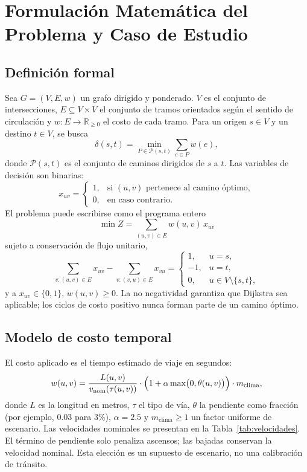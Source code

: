 \section{Formulación Matemática del Problema y Caso de Estudio}
\label{sec:formulacion}

\subsection{Definición formal}
Sea $G=(V,E,w)$ un grafo dirigido y ponderado. $V$ es el conjunto de intersecciones, $E\subseteq V\times V$ el conjunto de tramos orientados según el sentido de circulación y $w:E\to\mathbb{R}_{\ge 0}$ el costo de cada tramo. Para un origen $s\in V$ y un destino $t\in V$, se busca
\begin{equation}
    \delta(s,t)=\min_{P\in\mathcal{P}(s,t)}\sum_{e\in P}w(e),
    \label{eq:objetivo}
\end{equation}
donde $\mathcal{P}(s,t)$ es el conjunto de caminos dirigidos de $s$ a $t$. Las variables de decisión son binarias:
\begin{equation}
    x_{uv}=\begin{cases}1, & \text{si }(u,v)\text{ pertenece al camino óptimo},\\ 0, & \text{en caso contrario.}\end{cases}
    \label{eq:variables}
\end{equation}
El problema puede escribirse como el programa entero
\begin{equation}
    \min Z=\sum_{(u,v)\in E}w(u,v)\,x_{uv}
    \label{eq:z}
\end{equation}
sujeto a conservación de flujo unitario,
\begin{equation}
    \sum_{v:(u,v)\in E}x_{uv}-\sum_{v:(v,u)\in E}x_{vu}=
    \begin{cases}
        1, & u=s,\\
        -1, & u=t,\\
        0, & u\in V\setminus\{s,t\},
    \end{cases}
    \label{eq:flujo}
\end{equation}
y a $x_{uv}\in\{0,1\}$, $w(u,v)\ge 0$. La no negatividad garantiza que Dijkstra sea aplicable; los ciclos de costo positivo nunca forman parte de un camino óptimo.

\subsection{Modelo de costo temporal}
El costo aplicado es el tiempo estimado de viaje en segundos:
\begin{equation}
    w(u,v)=\frac{L(u,v)}{v_{\text{nom}}(\tau(u,v))}\cdot\Bigl(1+\alpha\max\bigl(0,\theta(u,v)\bigr)\Bigr)\cdot m_{\text{clima}},
    \label{eq:costo}
\end{equation}
donde $L$ es la longitud en metros, $\tau$ el tipo de vía, $\theta$ la pendiente como fracción (por ejemplo, $0.03$ para $3\%$), $\alpha=2.5$ y $m_{\text{clima}}\ge 1$ un factor uniforme de escenario. Las velocidades nominales se presentan en la Tabla~\ref{tab:velocidades}. El término de pendiente solo penaliza ascensos; las bajadas conservan la velocidad nominal. Esta elección es un supuesto de escenario, no una calibración de tránsito.

